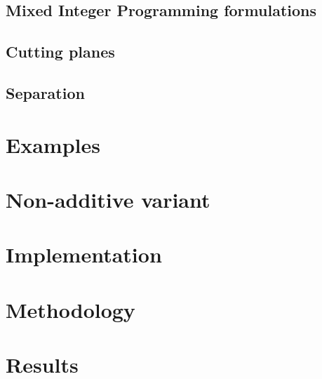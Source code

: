 \subsection{Mixed Integer Programming formulations}\label{subsec:ramp-pricing-problem-mip}


%

\subsection{Cutting planes}\label{subsec:ramp-cutting-planes}


\subsection{Separation}\label{subsec:separation}


\section{Examples}\label{sec:ramp-examples}


\section{Non-additive variant}\label{sec:ramp-nonadditive}


\section{Implementation}\label{sec:ramp-implementation}


\section{Methodology}\label{sec:ramp-methodology}


\section{Results}\label{sec:ramp-results}



